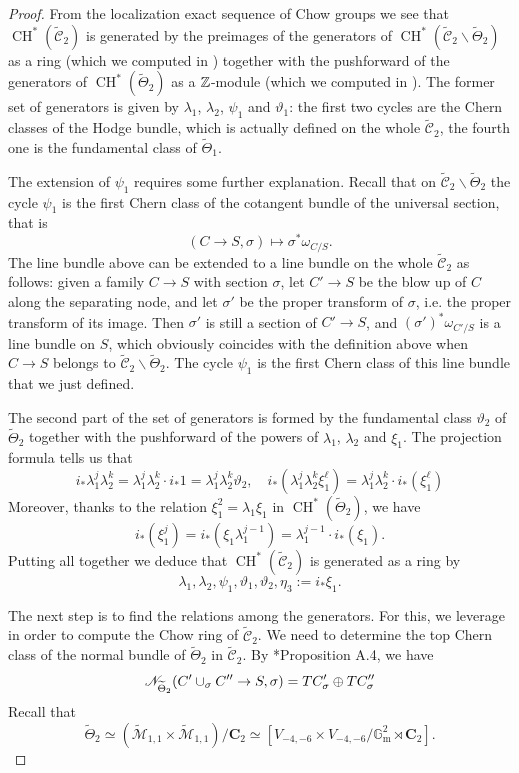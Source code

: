 \documentclass[a4paper, 10pt]{amsart}
\numberwithin{equation}{section}
\numberwithin{subsection}{section}
\theoremstyle{definition}
\theoremstyle{remark}
\renewcommand{\mathcal}{\mathscr}
\newcommand\GG{\mathbb{G}} \newcommand\HH{\mathbb{H}}
\newcommand\bC{\mathbf{C}} \newcommand\bD{\mathbf{D}}
\newcommand\rmm{\mathrm{m}} \newcommand\rmn{\mathrm{n}}
\newcommand{\gm}{\GG_{\rmm}}
\newcommand{\Mtilde}{\widetilde{\mathcal M}}
\newcommand{\Ctilde}{\widetilde{\mathcal C}}
\newcommand{\ThTilde}{\widetilde{\Theta}}
\newcommand{\ch}[1][*]{\operatorname{CH}^{#1}}
\begin{document}
	\begin{proof}
		From the localization exact sequence of Chow groups we see that $\ch(\Ctilde_2)$ is generated by the preimages of the generators of $\ch(\Ctilde_2\smallsetminus\ThTilde_2)$ as a ring (which we computed in ) together with the pushforward of the generators of $\ch(\ThTilde_2)$ as a $\mathbb{Z}$-module (which we computed in ). The former set of generators is given by $\lambda_1$, $\lambda_2$, $\psi_1$ and $\vartheta_1$: the first two cycles are the Chern classes of the Hodge bundle, which is actually defined on the whole $\Ctilde_2$, the fourth one is the fundamental class of $\ThTilde_1$.
		
		The extension of $\psi_1$ requires some further explanation.
		Recall that on $\Ctilde_2\smallsetminus\ThTilde_2$ the cycle $\psi_1$ is the first Chern class of the cotangent bundle of the universal section, that is
		\[ (C\to S,\sigma)\longmapsto \sigma^*\omega_{C/S}. \]
		The line bundle above can be extended to a line bundle on the whole $\Ctilde_2$ as follows: given a family $C\to S$ with section $\sigma$, let $C'\to S$ be the blow up of $C$ along the separating node, and let $\sigma'$ be the proper transform of $\sigma$, i.e. the proper transform of its image. Then $\sigma'$ is still a section of $C'\to S$, and $(\sigma')^*\omega_{C'/S}$ is a line bundle on $S$, which obviously coincides with the definition above when $C\to S$ belongs to $\Ctilde_2\smallsetminus\ThTilde_2$. The cycle $\psi_1$ is the first Chern class of this line bundle that we just defined.
		
		The second part of the set of generators is formed by the fundamental class $\vartheta_2$ of $\ThTilde_2$ together with the pushforward of the powers of $\lambda_1$, $\lambda_2$ and $\xi_1$. The projection formula tells us that
		\[ i_*\lambda_1^j\lambda_2^k = \lambda_1^j\lambda_2^k\cdot i_*1 = \lambda_1^j\lambda_2^k\vartheta_2,\quad i_*(\lambda_1^j\lambda_2^k\xi_1^\ell)=\lambda_1^j\lambda_2^k\cdot i_*(\xi_1^\ell)  \]
		Moreover, thanks to the relation $\xi_1^2=\lambda_1\xi_1$ in $\ch(\ThTilde_2)$, we have
		\[ i_*(\xi_1^j)=i_*(\xi_1\lambda_1^{j-1})=\lambda_1^{j-1}\cdot i_*(\xi_1). \]
		Putting all together we deduce that $\ch(\Ctilde_2)$ is generated as a ring by
		\[ \lambda_1,\lambda_2,\psi_1,\vartheta_1,\vartheta_2,\eta_3:=i_*\xi_1. \]
		
		The next step is to find the relations among the generators. For this, we leverage  in order to compute the Chow ring of $\Ctilde_2$. We need to determine the top Chern class of the normal bundle of $\ThTilde_2$ in $\Ctilde_2$. By \cite{DLV}*{Proposition A.4}, we have
		\[ \cN_{\ThTilde_2}(C'\cup_{\sigma} C''\to S,\sigma)= TC'_{\sigma}\oplus TC''_{\sigma}\]
		Recall that
		\[ \ThTilde_2 \simeq (\Mtilde_{1,1}\times\Mtilde_{1,1})/\bC_2\simeq [V_{-4,-6}\times V_{-4,-6}/\gm^2\rtimes\bC_2]. \]
		

\end{proof}
\end{document}

